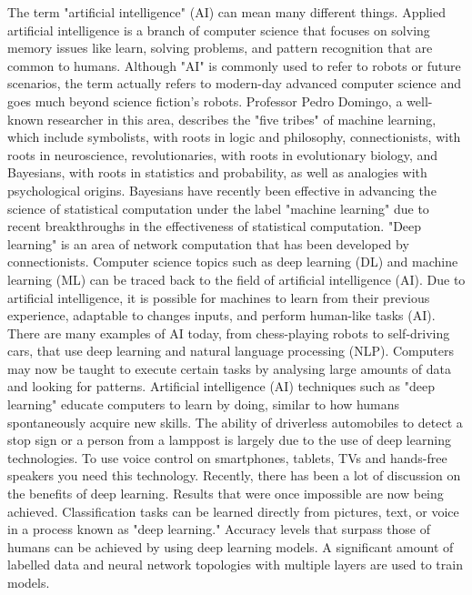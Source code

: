 \documentclass{ieeeaccess}
\begin{document}
The term "artificial intelligence" (AI) can mean many different things. Applied artificial intelligence is a branch of computer science that focuses on solving memory issues like learn, solving problems, and pattern recognition that are common to humans. Although "AI" is commonly used to refer to robots or future scenarios, the term actually refers to modern-day advanced computer science and goes much beyond science fiction's robots. Professor Pedro Domingo, a well-known researcher in this area, describes the "five tribes" of machine learning, which include symbolists, with roots in logic and philosophy, connectionists, with roots in neuroscience, revolutionaries, with roots in evolutionary biology, and Bayesians, with roots in statistics and probability, as well as analogies with psychological origins. Bayesians have recently been effective in advancing the science of statistical computation under the label "machine learning" due to recent breakthroughs in the effectiveness of statistical computation. "Deep learning" is an area of network computation that has been developed by connectionists. Computer science topics such as deep learning (DL) and machine learning (ML) can be traced back to the field of artificial intelligence (AI).
Due to artificial intelligence, it is possible for machines to learn from their previous experience, adaptable to changes inputs, and perform human-like tasks (AI). There are many examples of AI today, from chess-playing robots to self-driving cars, that use deep learning and natural language processing (NLP). Computers may now be taught to execute certain tasks by analysing large amounts of data and looking for patterns.
Artificial intelligence (AI) techniques such as "deep learning" educate computers to learn by doing, similar to how humans spontaneously acquire new skills. The ability of driverless automobiles to detect a stop sign or a person from a lamppost is largely due to the use of deep learning technologies. To use voice control on smartphones, tablets, TVs and hands-free speakers you need this technology. Recently, there has been a lot of discussion on the benefits of deep learning. Results that were once impossible are now being achieved. Classification tasks can be learned directly from pictures, text, or voice in a process known as "deep learning." Accuracy levels that surpass those of humans can be achieved by using deep learning models. A significant amount of labelled data and neural network topologies with multiple layers are used to train models.
\end{document}
